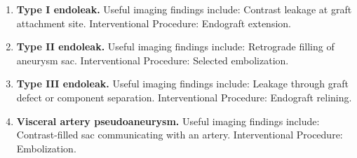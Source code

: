 \begin{enumerate}[leftmargin=*,itemsep=0.45em,topsep=0.4em]
\item \textbf{Type I endoleak.} Useful imaging findings include: Contrast leakage at graft attachment site. Interventional Procedure: Endograft extension.
\item \textbf{Type II endoleak.} Useful imaging findings include: Retrograde filling of aneurysm sac. Interventional Procedure: Selected embolization.
\item \textbf{Type III endoleak.} Useful imaging findings include: Leakage through graft defect or component separation. Interventional Procedure: Endograft relining.
\item \textbf{Visceral artery pseudoaneurysm.} Useful imaging findings include: Contrast-filled sac communicating with an artery. Interventional Procedure: Embolization.
\end{enumerate}

